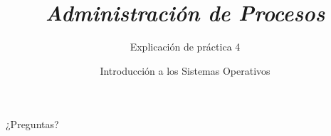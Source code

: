 


\author{Introducción a los Sistemas Operativos}



\title{\textit{Administración de Procesos}}
\subtitle{Explicación de práctica 4}
\begin{frame}
  \titlepage
\end{frame}

\begin{frame}{}
  \begin{center}
    \vfill
    \huge ¿Preguntas?
    \vfill
  \end{center}
\end{frame}


